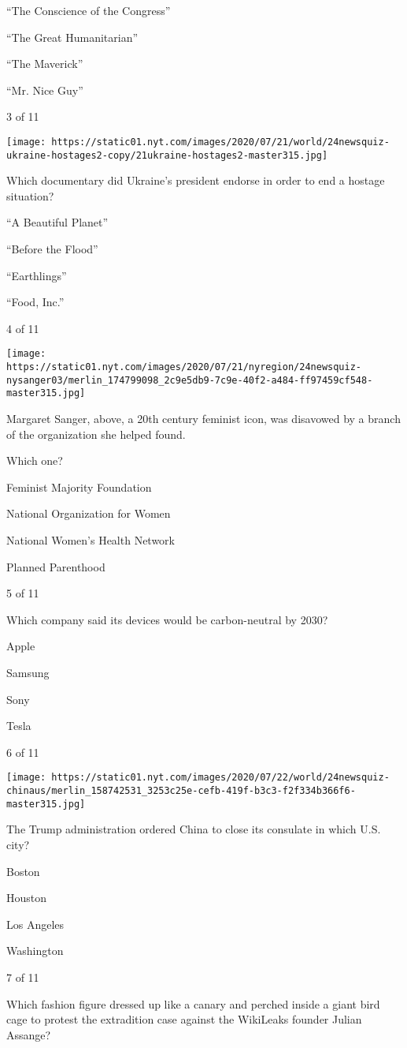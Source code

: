 ``The Conscience of the Congress''

``The Great Humanitarian''

``The Maverick''

``Mr. Nice Guy''

3 of 11

\texttt{[image: https://static01.nyt.com/images/2020/07/21/world/24newsquiz-ukraine-hostages2-copy/21ukraine-hostages2-master315.jpg]}

Which documentary did Ukraine's president endorse in order to end a
hostage situation?

``A Beautiful Planet''

``Before the Flood''

``Earthlings''

``Food, Inc.''

4 of 11

\texttt{[image: https://static01.nyt.com/images/2020/07/21/nyregion/24newsquiz-nysanger03/merlin\_174799098\_2c9e5db9-7c9e-40f2-a484-ff97459cf548-master315.jpg]}

Margaret Sanger, above, a 20th century feminist icon, was disavowed by a
branch of the organization she helped found.

Which one?

Feminist Majority Foundation

National Organization for Women

National Women's Health Network

Planned Parenthood

5 of 11

Which company said its devices would be carbon-neutral by 2030?

Apple

Samsung

Sony

Tesla

6 of 11

\texttt{[image: https://static01.nyt.com/images/2020/07/22/world/24newsquiz-chinaus/merlin\_158742531\_3253c25e-cefb-419f-b3c3-f2f334b366f6-master315.jpg]}

The Trump administration ordered China to close its consulate in which
U.S. city?

Boston

Houston

Los Angeles

Washington

7 of 11

Which fashion figure dressed up like a canary and perched inside a giant
bird cage to protest the extradition case against the WikiLeaks founder
Julian Assange?


